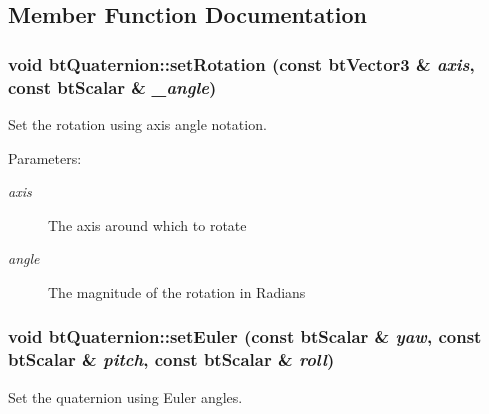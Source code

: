 \subsection{Member Function Documentation}
\hypertarget{classbt_quaternion_de840b704d06ad0092b996b432b8a8a6}{
\subsubsection[setRotation]{\setlength{\rightskip}{0pt plus 5cm}void btQuaternion::setRotation (const btVector3 \& {\em axis}, \/  const btScalar \& {\em \_\-angle})}}
\label{classbt_quaternion_de840b704d06ad0092b996b432b8a8a6}


Set the rotation using axis angle notation. 

\begin{Desc}
\item[Parameters:]
\begin{description}
\item[{\em axis}]The axis around which to rotate \item[{\em angle}]The magnitude of the rotation in Radians \end{description}
\end{Desc}
\hypertarget{classbt_quaternion_ed0a6469d6c6c1e379f1143ad62b3439}{
\subsubsection[setEuler]{\setlength{\rightskip}{0pt plus 5cm}void btQuaternion::setEuler (const btScalar \& {\em yaw}, \/  const btScalar \& {\em pitch}, \/  const btScalar \& {\em roll})}}
\label{classbt_quaternion_ed0a6469d6c6c1e379f1143ad62b3439}


Set the quaternion using Euler angles. 

